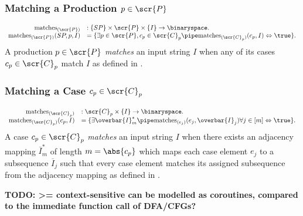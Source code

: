 \documentclass[10pt]{article}
\newcommand{\generalsubseq}{\overbar{I}}
\begin{document}
\subsubsection{Matching a Production $p \in \scr{P}$}
\label{sec:matching-a-production-p}
\begin{equation}
  \label{eq:matches-prod}
  \begin{array}{rl}
    \text{matches}_{(\scr{P})} &: \{SP\} \times \scr{P} \times \{I\} \rightarrow \binaryspace. \\
    \text{matches}_{(\scr{P})}(SP, p, I) &= \{ \exists p \in \scr{P}, c_p \in \scr{C}_p \pipe \text{matches}_{(\scr{C}_p)}(c_p, I) \Leftrightarrow \true \}.
  \end{array}
\end{equation}
A production $p \in \scr{P}$ \textit{matches} an input string $I$ when any of its cases $c_p \in \scr{C}_p$ match $I$ as defined in .

\subsubsection{Matching a Case $c_p \in \scr{C}_p$}
\label{sec:matching-a-case-cp-in-scrcp}
\begin{equation}
  \label{eq:matches-case}
  \begin{array}{rl}
    \text{matches}_{(\scr{C}_p)} &: \scr{C}_p \times \{I\} \rightarrow \binaryspace. \\
    \text{matches}_{(\scr{C}_p)}(c_p, I) &= \{ \exists \generalsubseq^*_m \pipe \text{matches}_{(e_j)}(e_j, \generalsubseq_j) \forall j \in [m] \Leftrightarrow \true \}.
  \end{array}
\end{equation}
A case $c_p \in \scr{C}_p$ \textit{matches} an input string $I$ when there exists an adjacency mapping $\generalsubseq^*_m$ of length $m = \abs{c_p}$ which maps each case element $e_j$ to a subsequence $\generalsubseq_j$ such that every case element matches its assigned subsequence from the adjacency mapping as defined in .

\textbf{TODO: >= context-sensitive can be modelled as coroutines, compared to the immediate function call of DFA/CFGs?}
\end{document}
